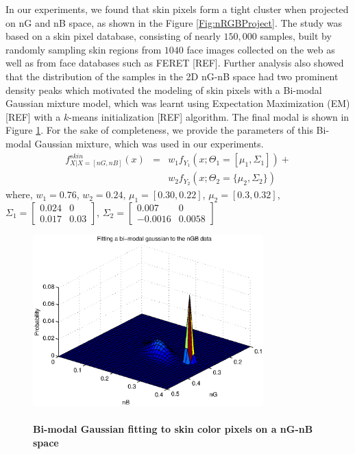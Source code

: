 \documentclass[times, 10pt,twocolumn]{article}
\begin{document}
In our experiments, we found that skin pixels form a tight cluster
when projected on nG and nB space, as shown in the Figure
\ref{Fig:nRGBProject}. The study was based on a skin pixel database,
consisting of nearly $150,000$ samples, built by randomly sampling
skin regions from $1040$ face images collected on the web as well as
from face databases such as FERET [REF]. Further analysis also showed
that the distribution of the samples in the 2D nG-nB space had two prominent density peaks
which motivated the modeling of skin pixels with a Bi-modal Gaussian
mixture model, which was learnt using Expectation Maximization (EM)[REF] with a
$k$-means initialization [REF] algorithm. The final modal is shown
in Figure \ref{Fig:BimodGaussian}. For the sake of completeness, we
provide the parameters of this Bi-modal Gaussian mixture, which was used in
our experiments.
\begin{eqnarray}
f^{skin}_{X|X=[nG,nB]}(x) & = & w_1 f_{Y_1}(x;\Theta_1=[\mu_1,\Sigma_1]) +  \nonumber  \\
       &  & w_2 f_{Y_2}(x;\Theta_2=\{\mu_2,\Sigma_2\})
\end{eqnarray}
where, $w_1 = 0.76$, $w_2 = 0.24$, $\mu_1 = [0.30,0.22]$, $\mu_2 =
[0.3, 0.32]$, $\Sigma_1=\left[ \begin{array}{cc} 0.024 & 0
\\ 0.017 & 0.03\end{array}\right]$, $\Sigma_2=\left[ \begin{array}{cc} 0.007 & 0
\\ -0.0016 & 0.0058\end{array}\right]$
\vspace{-0.15in}
\begin{figure}[h]
\centering
\includegraphics[width=3.5in]{Figure4.eps}
\caption{{\bf {\selectfont \\ Bi-modal Gaussian
fitting to skin color pixels on a nG-nB space}}}
\label{Fig:BimodGaussian}
\end{figure}
\end{document}
